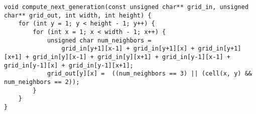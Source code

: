 \begin{lstlisting}
void compute_next_generation(const unsigned char** grid_in, unsigned char** grid_out, int width, int height) {
	for (int y = 1; y < height - 1; y++) {
		for (int x = 1; x < width - 1; x++) {
			unsigned char num_neighbors =
				grid_in[y+1][x-1] + grid_in[y+1][x] + grid_in[y+1][x+1] + grid_in[y][x-1] + grid_in[y][x+1] + grid_in[y-1][x-1] + grid_in[y-1][x] + grid_in[y-1][x+1];
			grid_out[y][x] =  ((num_neighbors == 3) || (cell(x, y) && num_neighbors == 2));
		}
	}
}
\end{lstlisting}
